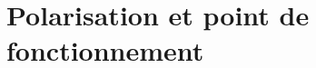 \documentclass{../../template/tp}
\newcommand{\itgv}[1]{\ifthenelse{\boolean{corrige}}{{\color{blue}#1}}{}} %
\begin{document}
	
\section{Polarisation et point de fonctionnement}

 







\end{document}
